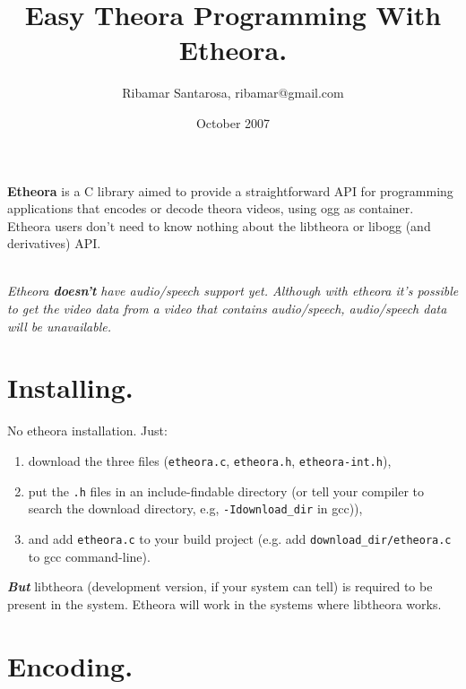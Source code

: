 \documentclass{article}
\title{\textbf{Easy Theora Programming With Etheora.}}
\author{Ribamar Santarosa, ribamar@gmail.com}
\date{October 2007}
\begin{document}
\maketitle

\textbf{Etheora} is a C library aimed to provide a straightforward API for
programming applications that encodes or decode theora videos, using ogg
as container. Etheora users don't need to know nothing about the libtheora
or libogg (and derivatives) API. 

~\\
\textit{Etheora \textbf{doesn't} have audio/speech support yet. Although  
with etheora it's possible to get the video data from a video that 
contains audio/speech, audio/speech data will be unavailable.}

\section{Installing.}

No etheora installation. Just:
\begin{enumerate}
\item download the three files (\texttt{etheora.c}, 
\texttt{etheora.h}, \texttt{etheora-int.h}), 
\item put the \texttt{.h} files in an
include-findable directory (or tell your compiler to search the download 
directory, e.g, \texttt{-Idownload\_dir} in gcc)), 
\item and add \texttt{etheora.c} to your build project (e.g. add
\texttt{download\_dir/etheora.c} to gcc command-line). 
\end{enumerate}

\textit{\textbf{But}} libtheora (development version, if your system can tell)
is required to be present in the system. Etheora will work in the
systems where libtheora works. 

\section{Encoding.}
\end{document}
